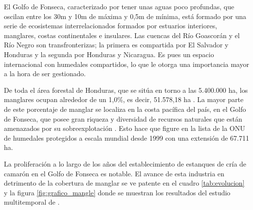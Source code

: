 El Golfo de Fonseca, caracterizado por tener unas aguas poco profundas, que oscilan entre los 30m y 10m de máxima y 0,5m de mínima, está formado por una serie de ecosistemas interrelacionados formados por estuarios interiores, manglares, costas continentales e insulares. Las cuencas del Río Goascorán y el Río Negro son transfronterizas; la primera es compartida por El Salvador y Honduras y la segunda por Honduras y Nicaragua. Es pues un espacio internacional con humedales compartidos, lo que le otorga una importancia mayor a la hora de ser gestionado.%

De toda el área forestal de Honduras, que se sitúa en torno a las 5.400.000 ha, los manglares ocupan alrededor de un 1,0\%, es decir, 51.578,18 ha \citep{anuario2013}. La mayor parte de este porcentaje de manglar se localiza en la costa pacífica del país, en el Golfo de Fonseca, que posee gran riqueza y diversidad de recursos naturales que están amenazados por su sobreexplotación \citep{Jimenez1994}. Esto hace que figure en la lista \cite{Ramsar2014} de la ONU de humedales protegidos a escala mundial desde 1999 con una extensión de 67.711 ha.%

La proliferación a lo largo de los años del establecimiento de estanques de cría de camarón en el Golfo de Fonseca es notable. El avance de esta industria en detrimento de la cobertura de manglar se ve patente en el cuadro \ref{tab:evolucion} y la figura \ref{fig:grafico_mangle} donde se muestran los resultados del estudio multitemporal de \cite{laborate2014}.%

